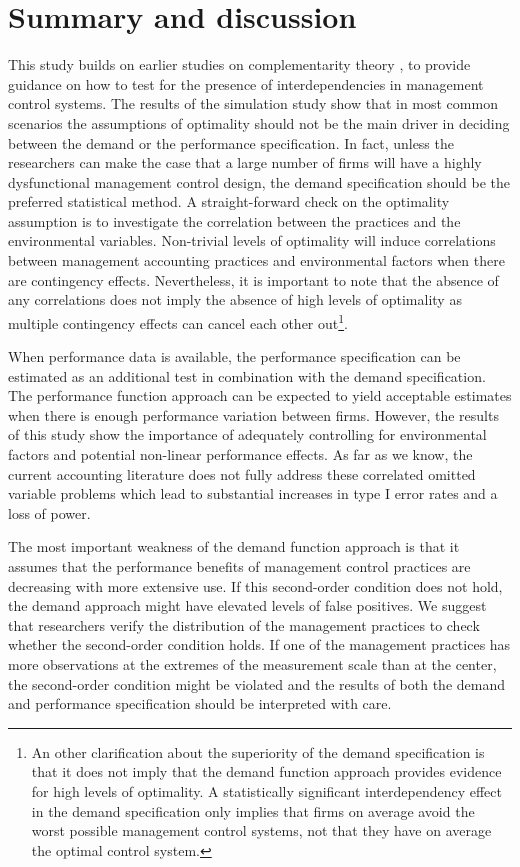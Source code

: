 \documentclass[12pt]{article}
\begin{document}
\section{Summary and discussion}\label{summary-and-discussion}

This study builds on earlier studies on complementarity theory \citep{Milgrom1995, Grabner2013}, to provide guidance on how to test for the presence of interdependencies in management control systems. The results of the simulation study show that in most common scenarios the assumptions of optimality should not be the main driver in deciding between the demand or the performance specification. In fact, unless the researchers can make the case that a large number of firms will have a highly dysfunctional management control design, the demand specification should be the preferred statistical method. A straight-forward check on the optimality assumption is to investigate the correlation between the practices and the environmental variables. Non-trivial levels of optimality will induce correlations between management accounting practices and environmental factors when there are contingency effects. Nevertheless, it is important to note that the absence of any correlations does not imply the absence of high levels of optimality as multiple contingency effects can cancel each other out\footnote{An other clarification about the superiority of the demand specification is that it does not imply that the demand function approach provides evidence for high levels of optimality. A statistically significant interdependency effect in the demand specification only implies that firms on average avoid the worst possible management control systems, not that they have on average the optimal control system.}.

When performance data is available, the performance specification can be estimated as an additional test in combination with the demand specification. The performance function approach can be expected to yield acceptable estimates when there is enough performance variation between firms. However, the results of this study show the importance of adequately controlling for environmental factors and potential non-linear performance effects. As far as we know, the current accounting literature does not fully address these correlated omitted variable problems which lead to substantial increases in type I error rates and a loss of power.

The most important weakness of the demand function approach is that it assumes that the performance benefits of management control practices are decreasing with more extensive use. If this second-order condition does not hold, the demand approach might have elevated levels of false positives. We suggest that researchers verify the distribution of the management practices to check whether the second-order condition holds. If one of the management practices has more observations at the extremes of the measurement scale than at the center, the second-order condition might be violated and the results of both the demand and performance specification should be interpreted with care.
\end{document}
